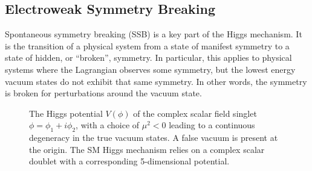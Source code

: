 \subsection{Electroweak Symmetry Breaking}\label{sec:sm_ewsb}

Spontaneous symmetry breaking (SSB) is a key part of the Higgs mechanism. It is the transition of a physical system from a state of manifest symmetry to a state of hidden, or ``broken'', symmetry. In particular, this applies to physical systems where the Lagrangian observes some symmetry, but the lowest energy vacuum states do not exhibit that same symmetry. In other words, the symmetry is broken for perturbations around the vacuum state.

%
\begin{figure}[!htbp]
  \centering
  
  \caption{
    The Higgs potential $V(\phi)$ of the complex scalar field singlet $\phi = \phi_1 + i \phi_2$, with a choice of $\mu^2 < 0$ leading to a continuous degeneracy in the true vacuum states. A false vacuum is present at the origin. The SM Higgs mechanism relies on a complex scalar doublet with a corresponding 5-dimensional potential.
  }
  \label{fig:higgs_potential}
\end{figure}
%


